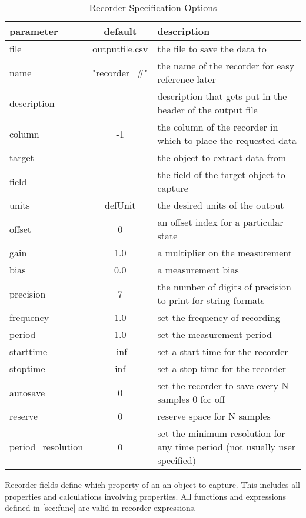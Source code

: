 \documentclass[12pt]{article} %
\begin{document}
 \begin{table}[ht]

     \caption{Recorder Specification Options} %
     \centering %
     \begin{tabular}{l c p{8cm}} %
         \hline %
         parameter & default & description \\ [0.5ex] %
         \hline %
         file & outputfile.csv & the file to save the data to \\ %
         name  & "recorder\_\#" & the name of the recorder for easy reference later \\
         description & & description that gets put in the header of the output file \\
         column & -1 & the column of the recorder in which to place the requested data  \\
         target  &  & the object to extract data from\\
         field &  & the field of the target object to capture \\
         units  & defUnit & the desired units of the output \\%
         offset & 0 & an offset index for a particular state \\
         gain & 1.0  & a multiplier on the measurement \\
         bias  & 0.0 & a measurement bias \\
         precision& 7 & the number of digits of precision to print for string formats \\
         frequency & 1.0 & set the frequency of recording \\
         period  & 1.0 & set the measurement period \\
         starttime & -inf & set a start time for the recorder \\
         stoptime & inf & set a stop time for the recorder \\
         autosave  & 0 & set the recorder to save every N samples 0 for off \\
         reserve& 0 & reserve space for N samples \\
         period\_resolution & 0 & set the minimum resolution for any time period (not usually user specified) \\
                 \hline %
     \end{tabular}
     \label{Table:recorderOptions}
 \end{table}
 Recorder fields define which property of an an object to capture.  This includes all properties and calculations involving properties.  All functions and expressions defined in \ref{sec:func} are valid in recorder expressions.
\end{document}

